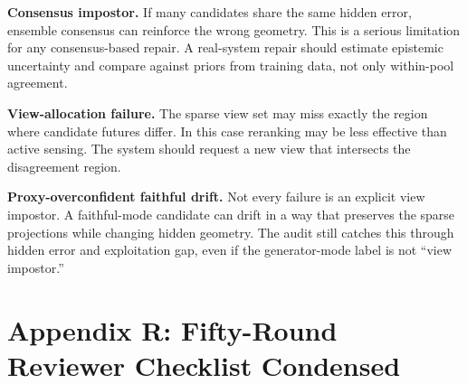 \documentclass{article}
\begin{document}
\textbf{Consensus impostor.}
If many candidates share the same hidden error, ensemble consensus can reinforce
the wrong geometry. This is a serious limitation for any consensus-based
repair. A real-system repair should estimate epistemic uncertainty and compare
against priors from training data, not only within-pool agreement.

\textbf{View-allocation failure.}
The sparse view set may miss exactly the region where candidate futures differ.
In this case reranking may be less effective than active sensing. The system
should request a new view that intersects the disagreement region.

\textbf{Proxy-overconfident faithful drift.}
Not every failure is an explicit view impostor. A faithful-mode candidate can
drift in a way that preserves the sparse projections while changing hidden
geometry. The audit still catches this through hidden error and exploitation
gap, even if the generator-mode label is not ``view impostor.''

\section{Appendix R: Fifty-Round Reviewer Checklist Condensed}
\end{document}
